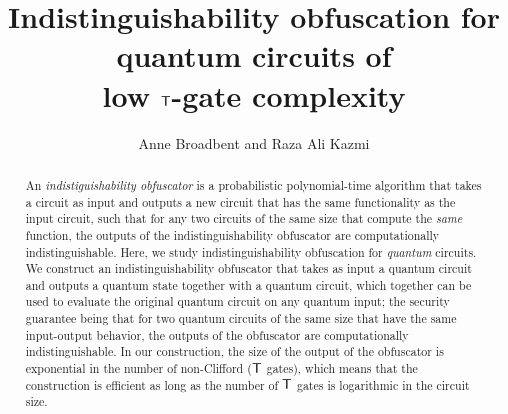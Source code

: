 \documentclass[english,11pt]{article}
\title{Indistinguishability obfuscation for \\quantum circuits of \\  low ${\sf T}$-gate complexity}
\author{Anne Broadbent and Raza Ali Kazmi}
\affil{University of Ottawa, Department of Mathematics and Statistics,\\\texttt{\{abroadbe,rkazmi\}@uottawa.ca.}}
\date{} %
\begin{document}
\maketitle

\begin{abstract}
An \emph{indistiguishability obfuscator} is a probabilistic polynomial-time algorithm that takes a circuit as input and outputs a new circuit  that has the same functionality as the input circuit, such that  for any two circuits of the same size that compute the \emph{same} function, the outputs of the indistinguishability obfuscator are computationally indistinguishable. Here, we study indistinguishability obfuscation for \emph{quantum} circuits. We construct an indistinguishability obfuscator that takes as input a quantum circuit and outputs a quantum state together with a quantum circuit, which together can be used to evaluate the original quantum circuit on any quantum input; the security guarantee being that for two quantum circuits of the same size that have the same input-output behavior, the outputs of the obfuscator are computationally indistinguishable. In our construction, the size of the output of the obfuscator is exponential in the number of non-Clifford (${\sf T}$ gates), which means that the construction is efficient as long as the number of ${\sf T}$ gates is logarithmic in the circuit size.
\end{abstract}

\newpage

\setcounter{tocdepth}{2}
\tableofcontents
\clearpage
{}







%


\end{document}

